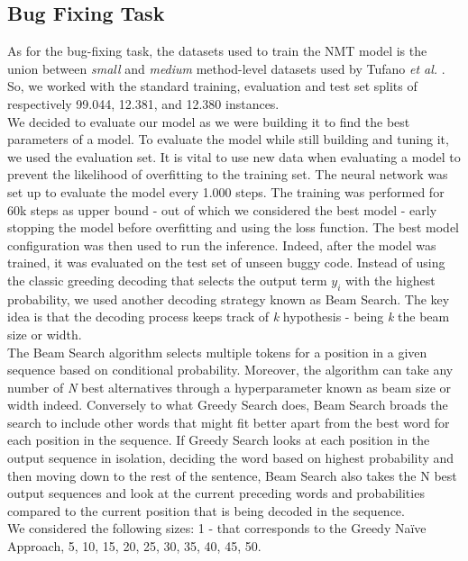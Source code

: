 \subsection{Bug Fixing Task}
As for the bug-fixing task, the datasets used to train the NMT model is the union between \textit{small} and \textit{medium} method-level datasets
used by Tufano \textit{et al.} \cite{Tufano2019}. So, we worked with the standard training, evaluation and test set splits of respectively
99.044, 12.381, and 12.380 instances.\\
We decided to evaluate our model as we were building it to find the best parameters of 
a model. To evaluate the model while still building and tuning it, we used the evaluation set. 
It is vital to use new data when evaluating a model to prevent the likelihood of overfitting to the 
training set. The neural network
was set up to evaluate the model every 1.000 steps. The training was performed for 60k steps as upper bound - 
out of which we considered the best model - early stopping the model before overfitting and using the loss function.
The best model configuration was then used to run the inference.
Indeed, after the model was trained, it was evaluated on the test set of unseen buggy code. 
Instead of using the classic greeding decoding that selects the output term \(y_i\) with the highest probability, we used another decoding
strategy known as Beam Search. 
The key idea is that the decoding process keeps track of \textit{k}
hypothesis - being \textit{k} the beam size or width.\\
The Beam Search algorithm selects multiple tokens for a position in a given sequence based on conditional probability. Moreover, the algorithm
can take any number of \textit{N} best alternatives through a hyperparameter known as beam size or width indeed. Conversely to what Greedy Search does, 
Beam Search broads the search to include other words that might fit better apart from the best word for each position in the sequence.
If Greedy Search looks at each position in the output sequence in isolation, deciding the word based on highest probability and then moving down to the rest of the sentence,
Beam Search also takes the N best output sequences and look at the current preceding words and probabilities compared to the current position that is being decoded in the sequence.\\
We considered the following sizes: 1 - that corresponds to the Greedy Naïve Approach, 5, 10, 15, 20, 25, 30, 35, 40, 45, 50.

